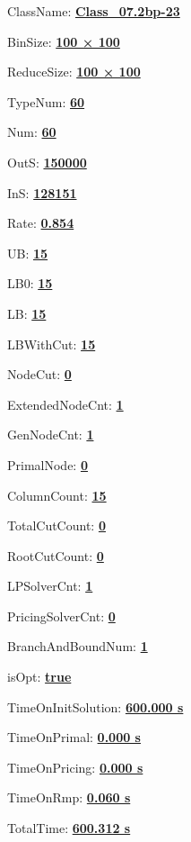 \documentclass[11pt]{article}
\begin{document}
\pagestyle{empty}


ClassName: \underline{\textbf{Class_07.2bp-23}}
\par
BinSize: \underline{\textbf{100 × 100}}
\par
ReduceSize: \underline{\textbf{100 × 100}}
\par
TypeNum: \underline{\textbf{60}}
\par
Num: \underline{\textbf{60}}
\par
OutS: \underline{\textbf{150000}}
\par
InS: \underline{\textbf{128151}}
\par
Rate: \underline{\textbf{0.854}}
\par
UB: \underline{\textbf{15}}
\par
LB0: \underline{\textbf{15}}
\par
LB: \underline{\textbf{15}}
\par
LBWithCut: \underline{\textbf{15}}
\par
NodeCut: \underline{\textbf{0}}
\par
ExtendedNodeCnt: \underline{\textbf{1}}
\par
GenNodeCnt: \underline{\textbf{1}}
\par
PrimalNode: \underline{\textbf{0}}
\par
ColumnCount: \underline{\textbf{15}}
\par
TotalCutCount: \underline{\textbf{0}}
\par
RootCutCount: \underline{\textbf{0}}
\par
LPSolverCnt: \underline{\textbf{1}}
\par
PricingSolverCnt: \underline{\textbf{0}}
\par
BranchAndBoundNum: \underline{\textbf{1}}
\par
isOpt: \underline{\textbf{true}}
\par
TimeOnInitSolution: \underline{\textbf{600.000 s}}
\par
TimeOnPrimal: \underline{\textbf{0.000 s}}
\par
TimeOnPricing: \underline{\textbf{0.000 s}}
\par
TimeOnRmp: \underline{\textbf{0.060 s}}
\par
TotalTime: \underline{\textbf{600.312 s}}
\par
\newpage


\end{document}
